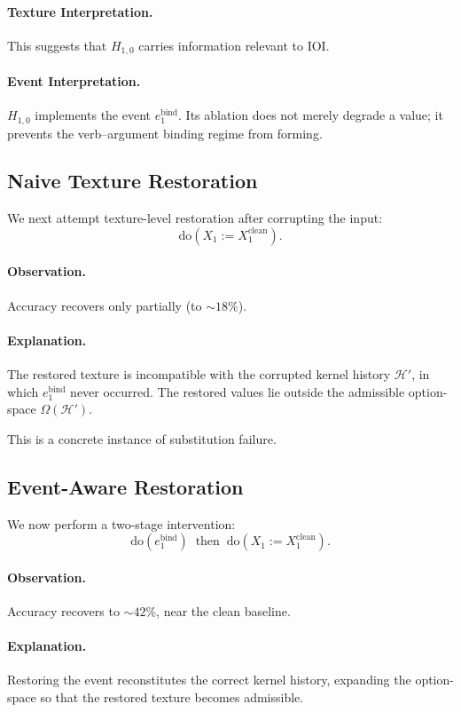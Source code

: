 \documentclass[11pt]{article}
\theoremstyle{remark}
\newcommand{\Hist}{\mathcal{H}}
\newcommand{\Do}{\mathrm{do}}
\begin{document}
\paragraph{Texture Interpretation.}
This suggests that $H_{1,0}$ carries information relevant to IOI.

\paragraph{Event Interpretation.}
$H_{1,0}$ implements the event $e_1^{\text{bind}}$. Its ablation does
not merely degrade a value; it prevents the verb–argument binding
regime from forming.

\subsection{Naive Texture Restoration}

We next attempt texture-level restoration after corrupting the input:
\[
\Do(X_1 := X_1^{\text{clean}}).
\]

\paragraph{Observation.}
Accuracy recovers only partially (to $\sim 18\%$).

\paragraph{Explanation.}
The restored texture is incompatible with the corrupted kernel
history $\Hist'$, in which $e_1^{\text{bind}}$ never occurred. The
restored values lie outside the admissible option-space
$\Omega(\Hist')$.

This is a concrete instance of substitution failure.

\subsection{Event-Aware Restoration}

We now perform a two-stage intervention:
\[
\Do(e_1^{\text{bind}}) \;\; \text{then} \;\; \Do(X_1 := X_1^{\text{clean}}).
\]

\paragraph{Observation.}
Accuracy recovers to $\sim 42\%$, near the clean baseline.

\paragraph{Explanation.}
Restoring the event reconstitutes the correct kernel history,
expanding the option-space so that the restored texture becomes
admissible.
\end{document}
